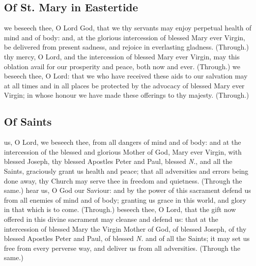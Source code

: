 \begin{multicols}{2}
    \newcolumn
    
    \subsection{Of St. Mary in Eastertide}\label{SPMaryInEaster}
    \collect
     we beseech thee, O Lord God, that we thy servants may enjoy perpetual health of mind and of body: and, at the glorious intercession of blessed Mary ever Virgin, be delivered from present sadness, and rejoice in everlasting gladness. (Through.)
    \secret
     thy mercy, O Lord, and the intercession of blessed Mary ever Virgin, may this oblation avail for our prosperity and peace, both now and ever. (Through.)
    \postcommunion
     we beseech thee, O Lord: that we who have received these aids to our salvation may at all times and in all places be protected by the advocacy of blessed Mary ever Virgin; in whose honour we have made these offerings to thy majesty. (Through.) %
    
    \newcolumn

    \subsection{Of Saints}\label{SPSaints}
    \collect
     us, O Lord, we beseech thee, from all dangers of mind and of body: and at the intercession of the blessed and glorious Mother of God, Mary ever Virgin, with blessed Joseph, thy blessed Apostles Peter and Paul, blessed \emph{N.}, and all the Saints, graciously grant us health and peace; that all adversities and errors being done away, thy Church may serve thee in freedom and quietness. (Through the same.)
    \secret
     hear us, O God our Saviour: and by the power of this sacrament defend us from all enemies of mind and of body; granting us grace in this world, and glory in that which is to come. (Through.)
    \postcommunion
     beseech thee, O Lord, that the gift now offered in this divine sacrament may cleanse and defend us: that at the intercession of blessed Mary the Virgin Mother of God, of blessed Joseph, of thy blessed Apostles Peter and Paul, of blessed \emph{N.} and of all the Saints; it may set us free from every perverse way, and deliver us from all adversities. (Through the same.)
    

\end{multicols}
